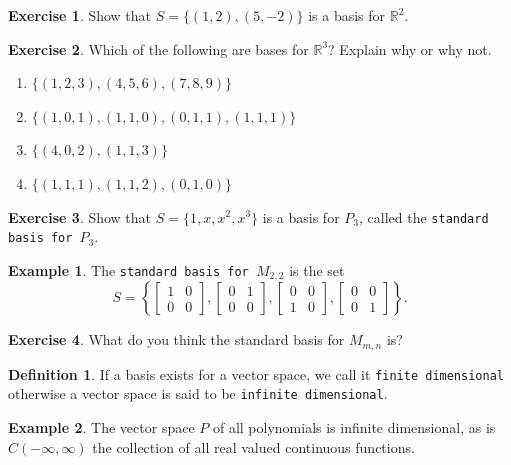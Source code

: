 \documentclass{beamer}
\newcommand{\R}{\mathbb{R}}
\newcommand{\fn}{\insertframenumber}
\theoremstyle{definition}
\newtheorem{exercise}{Exercise}
\newtheorem*{defn}{Definition}
\newtheorem*{exa}{Example}
\renewcommand{\emph}[1]{{\color{blue}\texttt{#1}}}
\begin{document}
\begin{frame}{\fn}
	\begin{exercise}\label{exercise:basisforR2}
		Show that $S=\{(1,2),(5,-2)\}$ is a basis for $\R^2$.
	\end{exercise}
	\pause
	\begin{exercise}
		Which of the following are bases for $\R^3$? Explain why or why not.
		\begin{enumerate}[label=(\alph*)]
			\item $\{(1,2,3),(4,5,6),(7,8,9)\}$
			\item $\{(1,0,1),(1,1,0),(0,1,1),(1,1,1)\}$
			\item $\{(4,0,2),(1,1,3)\}$
			\item $\{(1,1,1),(1,1,2),(0,1,0)\}$
		\end{enumerate}
	\end{exercise}
\end{frame}
\begin{frame}{\fn}
	\begin{exercise}
		Show that $S=\{1,x,x^2,x^3\}$ is a basis for $P_3$, called the \emph{standard basis for $P_3$}.
	\end{exercise}\pause
	\begin{exa}
		The \emph{standard basis for $M_{2,2}$} is the set 
			\[S=\left\{\begin{bmatrix}1&0\\0&0\end{bmatrix},\begin{bmatrix}0&1\\0&0\end{bmatrix},\begin{bmatrix}0&0\\1&0\end{bmatrix},\begin{bmatrix}0&0\\0&1\end{bmatrix}\right\}.\]
	\end{exa}
	\begin{exercise}
		What do you think the standard basis for $M_{m,n}$ is?
	\end{exercise}
\end{frame}
\begin{frame}{\fn}
	\begin{defn}
		If a basis exists for a vector space, we call it \emph{finite dimensional} otherwise a vector space is said to be \emph{infinite dimensional}.
	\end{defn}
	\begin{exa}
		The vector space $P$ of all polynomials is infinite dimensional, as is $C(-\infty,\infty)$ the collection of all real valued continuous functions.
	\end{exa}
\end{frame}
\end{document}
